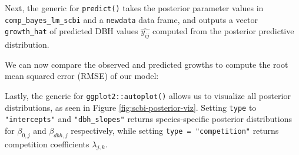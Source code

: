 \documentclass[12pt]{article}
\newenvironment{Shaded}{\begin{snugshade}}{\end{snugshade}}
\newcommand{\CommentTok}[1]{\textcolor[rgb]{0.56,0.35,0.01}{\textit{#1}}}
\newcommand{\DataTypeTok}[1]{\textcolor[rgb]{0.13,0.29,0.53}{#1}}
\newcommand{\KeywordTok}[1]{\textcolor[rgb]{0.13,0.29,0.53}{\textbf{#1}}}
\newcommand{\NormalTok}[1]{#1}
\newcommand{\OperatorTok}[1]{\textcolor[rgb]{0.81,0.36,0.00}{\textbf{#1}}}
\newcommand{\StringTok}[1]{\textcolor[rgb]{0.31,0.60,0.02}{#1}}
\begin{document}
Next, the generic for \texttt{predict()} takes the posterior parameter
values in \texttt{comp\_bayes\_lm\_scbi} and a \texttt{newdata} data
frame, and outputs a vector \texttt{growth\_hat} of predicted DBH values
\(\widehat{y_{ij}}\) computed from the posterior predictive
distribution.

\begin{Shaded}
\end{Shaded}

\begin{Shaded}
\end{Shaded}

We can now compare the observed and predicted growths to compute the
root mean squared error (RMSE) of our model:

\begin{Shaded}
\end{Shaded}

Lastly, the generic for \texttt{ggplot2::autoplot()} allows us to
visualize all posterior distributions, as seen in Figure
\ref{fig:scbi-posterior-viz}. Setting \texttt{type} to
\texttt{"intercepts"} and \texttt{"dbh\_slopes"} returns
species-specific posterior distributions for \(\beta_{0,j}\) and
\(\beta_{dbh,j}\) respectively, while setting
\texttt{type\ =\ "competition"} returns competition coefficients
\(\lambda_{j,k}\).
\end{document}
